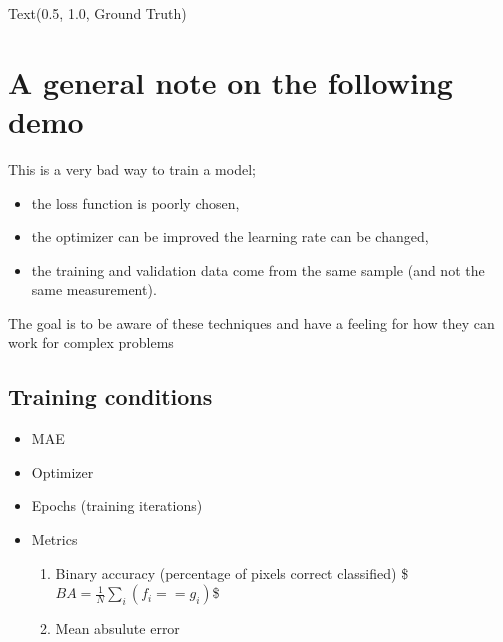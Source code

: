 \documentclass[letterpaper,10pt,english]{sphinxmanual}
\begin{document}
\begin{sphinxVerbatim}[commandchars=\\\{\}]
Text(0.5, 1.0, \PYGZsq{}Ground Truth\PYGZsq{})
\end{sphinxVerbatim}

\noindent{}


\section{A general note on the following demo}
\label{\detokenize{05-SupervisedSegmentation:a-general-note-on-the-following-demo}}
\sphinxAtStartPar
This is a very bad way to train a model;
\begin{itemize}
\item {} 
\sphinxAtStartPar
the loss function is poorly chosen,

\item {} 
\sphinxAtStartPar
the optimizer can be improved the learning rate can be changed,

\item {} 
\sphinxAtStartPar
the training and validation data  come from the same sample (and  not the same measurement).

\end{itemize}

\sphinxAtStartPar
The goal is to be aware of these techniques and have a feeling for how they can work for complex problems


\subsection{Training conditions}
\label{\detokenize{05-SupervisedSegmentation:training-conditions}}\begin{itemize}
\item {} 
\sphinxAtStartPar
{} \sphinxhyphen{} MAE

\item {} 
\sphinxAtStartPar
Optimizer \sphinxhyphen{} 

\item {} 
 Epochs (training iterations)

\item {} 
\sphinxAtStartPar
Metrics
\begin{enumerate}
%
\item {} 
\sphinxAtStartPar
Binary accuracy (percentage of pixels correct classified)
\$\(BA=\frac{1}{N}\sum_i(f_i==g_i)\)\$

\item {} 
\sphinxAtStartPar
Mean absulute error

\end{enumerate}

\end{itemize}
\end{document}
